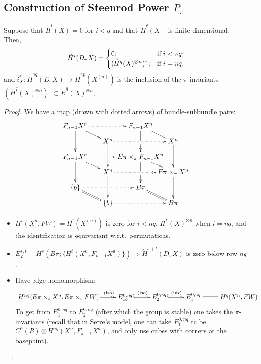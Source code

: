 \documentclass[11pt]{article}
\begin{document}
\begin{SteenrodTalk}
\pagebreak
\subsection*{Construction of Steenrod Power $P_\pi$}
\begin{lem*}\label{lemaboutpiadic}
Suppose that $\widetilde H^i (X) = 0$ for $i < q$ and that $\widetilde H^q (X)$ is finite dimensional.  Then,
\[\widetilde H^i(D_\pi X)=
\begin{cases}0;&\textup{if }i<nq;\\(\widetilde H^q(X)^{\otimes n})^\pi;&\textup{if }i=nq,%
\end{cases}
\]
and $i_X^*:\widetilde H^{nq}(D_\pi X)\to \widetilde H^{np}(X^{(n)})$ is the inclusion of the $\pi$-invariants $(\widetilde H^q(X)^{\otimes n})^\pi\subset\widetilde H^q(X)^{\otimes n}$.
\end{lem*}
\begin{proof}
We have a map (drawn with dotted arrows) of bundle-subbundle pairs:
\[\xymatrix@!0@C=1.7cm@R=.8cm{
F_{n-1}X^n\ar[dd]\ar[rd]\ar@{.>}[rr]&&F_{n-1}X^n\ar'[d][dd]\ar[rd]\\
&X^n\ar[dd]\ar@{.>}[rr]&&\ar[dd]X^n\\
F_{n-1}X^n\ar[dd]\ar[rd]\ar@{.>}'[r][rr]&&E\pi\times_\pi F_{n-1}X^n\ar'[d][dd]\ar[rd]\\
&X^n\ar[dd]\ar@{.>}[rr]&&\ar[dd]E\pi\times_\pi X^n\\
\{b\}\ar@{.>}'[r][rr]\ar@{=}[rd]&&B\pi\ar@{=}[rd]\\
&\{b\}\ar@{.>}[rr]&&B\pi
}\]
\begin{itemize}\squishlist
\item $H^i(X^n,FW)=\widetilde H^i(X^{(n)})$ is zero for $i<nq$, $H^*(X)^{\otimes n}$ when $i=nq$, and the identification is equivariant w.r.t.\ permutations.
\item $E_2^{s,t} = H^s(B\pi; \{H^t(X^n, F_{n-1} X^n)\}) \Rightarrow \widetilde H^{s+t}(D_\pi X)$ is zero below row $nq$.
\item Have edge homomorphism: 
\[\xymatrix{
H^{nq}(E\pi\times_\pi X^n,E\pi\times_\pi FW)\ar@{->>}[r]^{\text{\qquad\qquad\qquad \ \ (iso)}} &E^{0,nq}_\infty\ar@{^{(}->}[r]^{\text{(iso)}}&E^{0,nq}_2\ar@{^{(}->}[r]^{\text{(inv)}}&E_1^{0,nq}\ar@{=}[r]&H^q(X^n,FW)
}\]
To get from $E_1^{0,nq}$ to $E_2^{0,nq}$ (after which the group is stable) one takes the $\pi$-invariants (recall that in Serre's model, one can take $E_1^{0,nq}$ to be $C^0(B)\otimes H^{nq}(X^n,F_{n-1}X^n)$, and only use cubes with corners at the basepoint).\qedhere

\end{itemize}
\end{proof}
\end{SteenrodTalk}
\end{document}
